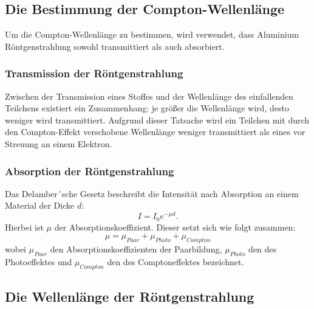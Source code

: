 \subsection{Die Bestimmung der Compton-Wellenlänge}
\label{sec:comptonwellenlänge}
Um die Compton-Wellenlänge zu bestimmen, wird verwendet, dass Aluminium Röntgenstrahlung sowohl transmittiert als auch absorbiert.
\subsubsection{Transmission der Röntgenstrahlung}
Zwischen der Transmission eines Stoffes und der Wellenlänge des einfallenden
Teilchens existiert ein Zusammenhang: je größer die Wellenlänge wird, desto weniger wird transmittiert. Aufgrund dieser Tatsache wird ein Teilchen mit durch den Compton-Effekt verschobene Wellenlänge weniger
transmittiert als eines vor Streuung an einem Elektron.

\subsubsection{Absorption der Röntgenstrahlung}
Das Delamber´sche Gesetz beschreibt die Intensität nach Absorption an einem Material der Dicke $d$:
\begin{equation}
	I = I_0 e^{- \mu d}.
	\label{eqn:intensitätabsorp}
\end{equation}
Hierbei ist $\mu$ der Absorptionskoeffizient. Dieser setzt sich wie folgt zusammen:
\begin{equation*}
	\mu = \mu_{Paar} + \mu_{Photo} + \mu_{Compton}
\end{equation*}
wobei $\mu_{Paar}$ den Absorptionskoeffizienten der Paarbildung, $\mu_{Photo}$ den des Photoeffektes und $\mu_{Compton}$ den des Comptoneffektes bezeichnet.

\subsection{Die Wellenlänge der Röntgenstrahlung}
